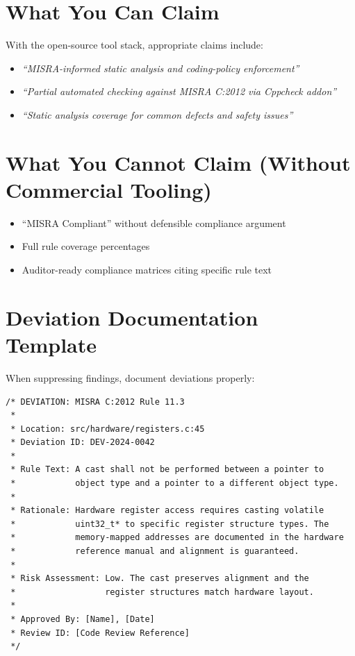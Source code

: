 \documentclass[11pt,letterpaper]{report}
\begin{document}
\section{What You Can Claim}

With the open-source tool stack, appropriate claims include:

\begin{itemize}[leftmargin=*]
    \item \textit{``MISRA-informed static analysis and coding-policy enforcement''}
    \item \textit{``Partial automated checking against MISRA C:2012 via Cppcheck addon''}
    \item \textit{``Static analysis coverage for common defects and safety issues''}
\end{itemize}

\section{What You Cannot Claim (Without Commercial Tooling)}

\begin{itemize}[leftmargin=*]
    \item ``MISRA Compliant'' without defensible compliance argument
    \item Full rule coverage percentages
    \item Auditor-ready compliance matrices citing specific rule text
\end{itemize}

\section{Deviation Documentation Template}

When suppressing findings, document deviations properly:

\begin{lstlisting}[style=cstyle]
/* DEVIATION: MISRA C:2012 Rule 11.3
 *
 * Location: src/hardware/registers.c:45
 * Deviation ID: DEV-2024-0042
 *
 * Rule Text: A cast shall not be performed between a pointer to
 *            object type and a pointer to a different object type.
 *
 * Rationale: Hardware register access requires casting volatile
 *            uint32_t* to specific register structure types. The
 *            memory-mapped addresses are documented in the hardware
 *            reference manual and alignment is guaranteed.
 *
 * Risk Assessment: Low. The cast preserves alignment and the
 *                  register structures match hardware layout.
 *
 * Approved By: [Name], [Date]
 * Review ID: [Code Review Reference]
 */
\end{lstlisting}
\end{document}

